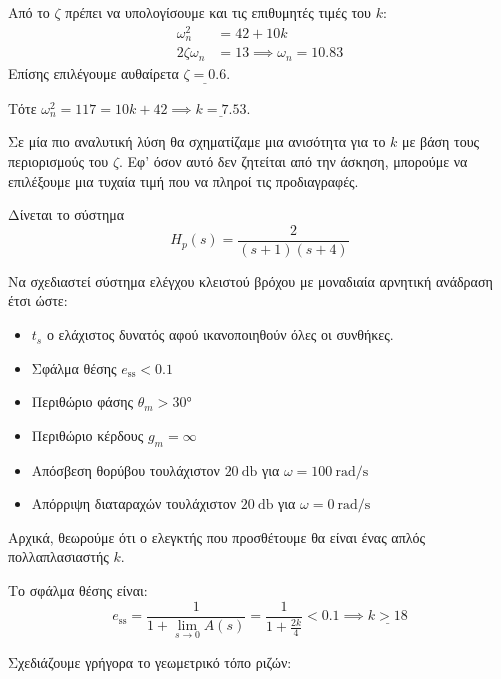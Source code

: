 \documentclass[11pt,a4paper,notitlepage,fleqn,final]{article}
\begin{document}
\begin{exercise}
Από το \( ζ \) πρέπει να υπολογίσουμε και τις επιθυμητές τιμές του \( k \):
\begin{align*}
	\omega_n^2 &= 42+10k \\
	2ζ\omega_n &= 13 \implies \omega_n = 10.83
\end{align*}
Επίσης επιλέγουμε αυθαίρετα \( \underline{ζ=0.6} \).

Τότε \( \omega_n^2 = 117 = 10k+42 \implies \underline{k=7.53} \).

Σε μία πιο αναλυτική λύση θα σχηματίζαμε μια ανισότητα για το \( k \) με βάση τους περιορισμούς του \( ζ \). Εφ' όσον αυτό δεν ζητείται από την άσκηση, μπορούμε να επιλέξουμε
μια τυχαία τιμή που να πληροί τις προδιαγραφές.

\end{exercise}

\begin{exercise}
Δίνεται το σύστημα
\[
H_p(s) = \frac{2}{(s+1)(s+4)}
\]

Να σχεδιαστεί σύστημα ελέγχου κλειστού βρόχου με μοναδιαία αρνητική ανάδραση έτσι ώστε:
\begin{itemize}
	\item \( t_s \) ο ελάχιστος δυνατός αφού ικανοποιηθούν όλες οι συνθήκες.
	\item Σφάλμα θέσης \( e_{\mathrm{ss}} < 0.1 \)
	\item Περιθώριο φάσης \( \theta_m > \ang{30} \)
	\item Περιθώριο κέρδους \( g_m = \infty \)
	\item Απόσβεση θορύβου τουλάχιστον \( \SI{20}{\decibel} \) για \( \omega = \SI{100}{\radian/\second} \)
	\item Απόρριψη διαταραχών τουλάχιστον \( \SI{20}{\decibel} \) για \( \omega = \SI{0}{\radian/\second} \)
\end{itemize}

\tcblower
Αρχικά, θεωρούμε ότι ο ελεγκτής που προσθέτουμε θα είναι ένας απλός πολλαπλασιαστής \( k \).

Το σφάλμα θέσης είναι:
\[
e_{\mathrm{ss}} = \frac{1}{1+ \lim_{s\to 0} A(s)}
= \frac{1}{1+\frac{2k}{4}} < 0.1 \implies \underline{k > 18}
\]

Σχεδιάζουμε γρήγορα το γεωμετρικό τόπο ριζών:

\end{exercise}
\end{document}
